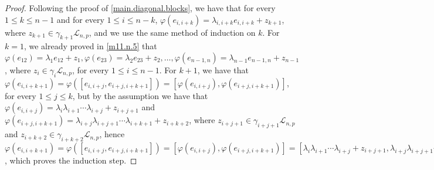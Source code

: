 \documentclass[12pt]{article}
\begin{document}
\begin{proof}
Following the proof of \ref{main.diagonal.blocks}, we have that for every $1\leq k\leq n-1$ and for every $1\leq i\leq n-k$, $\varphi(e_{i,i+k})=\lambda_{i,i+k}e_{i,i+k}+z_{k+1}$, where $z_{k+1}\in\gamma_{k+1}\mathcal{L}_{n,p}$, and we use the same method of induction on $k$. For $k=1$, we already proved in \ref{m11.n.5} that $\varphi(e_{12})=\lambda_1 e_{12}+z_1,\varphi(e_{23})=\lambda_2 e_{23}+z_2,\dots,\varphi(e_{n-1,n})=\lambda_{n-1}e_{n-1,n}+z_{n-1}$, where $z_i\in\gamma_i\mathcal{L}_{n,p}$, for every $1\leq i\leq n-1$. For $k+1$, we have that $\varphi(e_{i,i+k+1})=\varphi([e_{i,i+j},e_{i+j,i+k+1}])=[\varphi(e_{i,i+j}),\varphi(e_{i+j,i+k+1})]$, for every $1\leq j\leq k$, but by the assumption we have that $\varphi(e_{i,i+j})=\lambda_i\lambda_{i+1}\cdots\lambda_{i+j}+z_{i+j+1}$ and $\varphi(e_{i+j,i+k+1})=\lambda_{i+j}\lambda_{i+j+1}\cdots\lambda_{i+k+1}+z_{i+k+2}$, where $z_{i+j+1}\in\gamma_{i+j+1}\mathcal{L}_{n,p}$ and $z_{i+k+2}\in\gamma_{i+k+2}\mathcal{L}_{n,p}$, hence $\varphi(e_{i,i+k+1})=\varphi([e_{i,i+j},e_{i+j,i+k+1}])=[\varphi(e_{i,i+j}),\varphi(e_{i+j,i+k+1})]=[\lambda_i\lambda_{i+1}\cdots\lambda_{i+j}+z_{i+j+1},\lambda_{i+j}\lambda_{i+j+1}\cdots\lambda_{i+k+1}+z_{i+k+2}]=\lambda_i\lambda_{i+1}\lambda_{i+2}\lambda_{i+k}\cdots\lambda_{i+k+1}+z_{i+k+2}$, which proves the induction step.
\end{proof}
\end{document}
